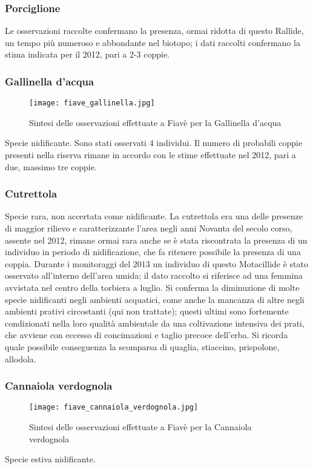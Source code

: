 \documentclass[11pt,a4paper,twoside]{memoir}
\begin{document}
\subsubsection{Porciglione}
Le osservazioni raccolte confermano la presenza, ormai ridotta di questo Rallide, un tempo più numeroso e abbondante nel biotopo; i dati raccolti confermano la stima indicata per il 2012, pari a 2-3 coppie.

\subsubsection{Gallinella d'acqua}
\vspace*{\fill}
\begin{figure}[H]
  \centering
  \texttt{[image: fiave\_gallinella.jpg]}
  \caption{Sintesi delle osservazioni effettuate a Fiavè per la Gallinella d'acqua}
\end{figure}\vspace*{\fill}
Specie nidificante. Sono stati osservati 4 individui. Il numero di probabili coppie presenti nella riserva rimane in accordo con le stime effettuate nel 2012, pari a due, massimo tre coppie.

\subsubsection{Cutrettola}
Specie rara, non accertata come nidificante. La cutrettola era una delle presenze di maggior rilievo e caratterizzante l'area negli anni Novanta del secolo corso, assente nel 2012, rimane ormai rara anche se è stata riscontrata la presenza di un individuo in periodo di nidificazione, che fa ritenere possibile la presenza di una coppia. Durante i monitoraggi del 2013 un individuo di questo Motacillide è stato osservato all'interno dell’area umida; il dato raccolto si riferisce ad una femmina avvistata nel centro della torbiera a luglio. 
Si conferma la diminuzione di molte specie nidificanti negli ambienti acquatici, come anche la mancanza di altre negli ambienti prativi circostanti (qui non trattate); questi ultimi sono fortemente condizionati nella loro qualità ambientale da una coltivazione intensiva dei prati, che avviene con eccesso di concimazioni e taglio precoce dell’erba. Si ricorda quale possibile conseguenza la scomparsa di quaglia, stiaccino, prispolone, allodola.

\subsubsection{Cannaiola verdognola}
\vspace*{\fill}
\begin{figure}[H]
  \centering
  \texttt{[image: fiave\_cannaiola\_verdognola.jpg]}
  \caption{Sintesi delle osservazioni effettuate a Fiavè per la Cannaiola verdognola}
\end{figure}\vspace*{\fill}
Specie estiva nidificante. 
\end{document}
